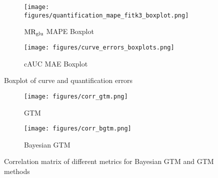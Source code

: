 \begin{figure}
	\centering
	\begin{subfigure}[b]{0.45\textwidth}
		\texttt{[image: figures/quantification\_mape\_fitk3\_boxplot.png]}
		\caption{\(\text{MR}_{\text{glu}}\) MAPE Boxplot}
		\label{subfig:fitk3_mape}
	\end{subfigure}
	\begin{subfigure}[b]{0.45\textwidth}
		\texttt{[image: figures/curve\_errors\_boxplots.png]}
		\caption{cAUC MAE Boxplot}
		\label{subfig:curve_errors_boxplot}
	\end{subfigure}
	\label{fig:boxplots}
	\caption{Boxplot of curve and quantification errors}
\end{figure}

\begin{figure}
	\centering
	\begin{subfigure}{0.45\textwidth}
		\texttt{[image: figures/corr\_gtm.png]}
		\caption{GTM}
		\label{subfig:corr_gtm}
	\end{subfigure}
	\begin{subfigure}{0.45\textwidth}
		\texttt{[image: figures/corr\_bgtm.png]}
		\caption{Bayesian GTM}
		\label{subfig:corr_bgtm}
	\end{subfigure}
	\label{fig:corr_mat}
	\caption{Correlation matrix of different metrics for Bayesian GTM and GTM methods}
\end{figure}




